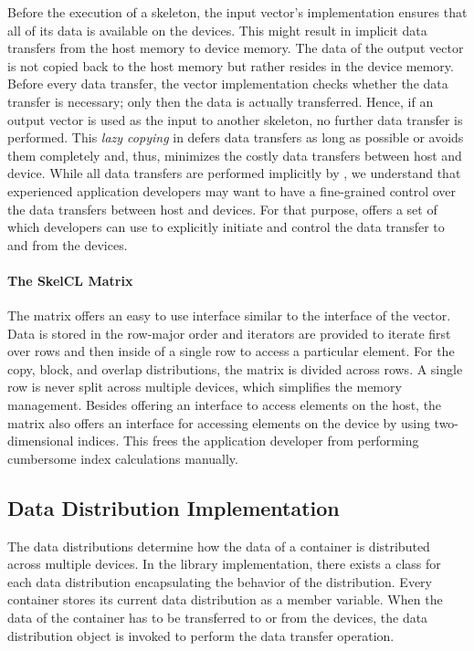 Before the execution of a skeleton, the input vector's implementation ensures that all of its data is available on the devices.
This might result in implicit data transfers from the host memory to device memory.
The data of the output vector is not copied back to the host memory but rather resides in the device memory.
Before every data transfer, the vector implementation checks whether the data transfer is necessary;
only then the data is actually transferred.
Hence, if an output vector is used as the input to another skeleton, no further data transfer is performed.
This \emph{lazy copying} in \SkelCL defers data transfers as long as possible or avoids them completely and, thus, minimizes the costly data transfers between host and device.
While all data transfers are performed implicitly by \SkelCL, we understand that experienced application developers may want to have a fine-grained control over the data transfers between host and devices.
For that purpose, \SkelCL offers a set of \APIs which developers can use to explicitly initiate and control the data transfer to and from the devices.



\paragraph{The SkelCL Matrix}
The \SkelCL matrix offers an easy to use interface similar to the interface of the vector.
Data is stored in the row-major order and iterators are provided to iterate first over rows and then inside of a single row to access a particular element.
For the copy, block, and overlap distributions, the matrix is divided across rows.
A single row is never split across multiple devices, which simplifies the memory management.
Besides offering an interface to access elements on the host, the matrix also offers an interface for accessing elements on the device by using two-dimensional indices.
This frees the application developer from performing cumbersome index calculations manually.










\subsection{Data Distribution Implementation}
\label{section:skelcl-library:distribution}
The data distributions determine how the data of a container is distributed across multiple devices.
In the \SkelCL library implementation, there exists a class for each data distribution encapsulating the behavior of the distribution.
Every container stores its current data distribution as a member variable.
When the data of the container has to be transferred to or from the devices, the data distribution object is invoked to perform the data transfer operation.

